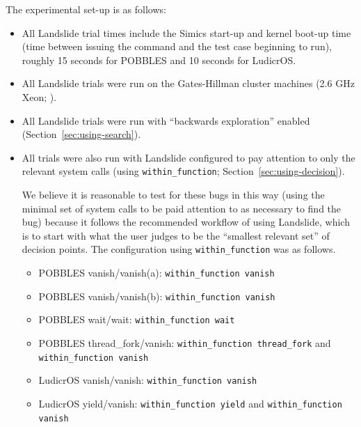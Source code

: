 
The experimental set-up is as follows:

\begin{itemize}
	\item All Landslide trial times include the Simics start-up and kernel boot-up time (time between issuing the command and the test case beginning to run), roughly 15 seconds for POBBLES and 10 seconds for LudicrOS.
	\item All Landslide trials were run on the Gates-Hillman cluster machines (2.6 GHz Xeon; ).
	\item All Landslide trials were run with ``backwards exploration'' enabled (Section~\ref{sec:using-search}).
	\item All trials were also run with Landslide configured to pay attention to only the relevant system calls (using \texttt{within\_function}; Section~\ref{sec:using-decision}).

	We believe it is reasonable to test for these bugs in this way (using the minimal set of system calls to be paid attention to as necessary to find the bug) because it follows the recommended workflow of using Landslide, which is to start with what the user judges to be the ``smallest relevant set'' of decision points. The configuration using \texttt{within\_function} was as follows.
	{\small
	\begin{itemize}
		\item POBBLES vanish/vanish(a): \texttt{within\_function vanish}
		\item POBBLES vanish/vanish(b): \texttt{within\_function vanish}
		\item POBBLES wait/wait: \texttt{within\_function wait}
		\item POBBLES thread\_fork/vanish: \texttt{within\_function thread\_fork} and \texttt{within\_function vanish}
		\item LudicrOS vanish/vanish: \texttt{within\_function vanish}
		\item LudicrOS yield/vanish: \texttt{within\_function yield} and \texttt{within\_function vanish}
	\end{itemize}
	}
\end{itemize}

